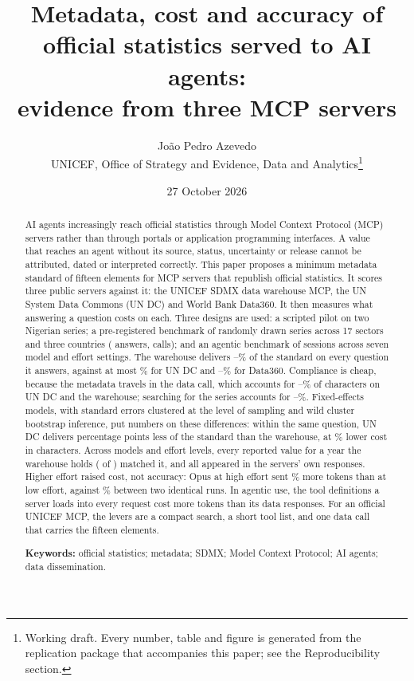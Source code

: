 \documentclass[11pt,a4paper]{article}
\title{Metadata, cost and accuracy of official statistics served to AI agents:\\ evidence from three MCP servers}
\author{Jo\~ao Pedro Azevedo\\ UNICEF, Office of Strategy and Evidence, Data and Analytics\thanks{Working draft. Every number, table and figure is generated from the replication package that accompanies this paper; see the Reproducibility section.}}
\date{27 October 2026}
\begin{document}
\maketitle

\begin{abstract}
\noindent AI agents increasingly reach official statistics through Model Context Protocol (MCP) servers rather than through portals or application programming interfaces. A value that reaches an agent without its source, status, uncertainty or release cannot be attributed, dated or interpreted correctly. This paper proposes a minimum metadata standard of fifteen elements for MCP servers that republish official statistics. It scores three public servers against it: the UNICEF SDMX data warehouse MCP, the UN System Data Commons (UN DC) and World Bank Data360. It then measures what answering a question costs on each. Three designs are used: a scripted pilot on two Nigerian series; a pre-registered benchmark of \nSeries{} randomly drawn series across 17 sectors and three countries (\nAnswers{} answers, \callsUsed{} calls); and an agentic benchmark of \sessions{} sessions across seven model and effort settings. The warehouse delivers \whShareMin--\whShareMax\% of the standard on every question it answers, against at most \unShareMax\% for UN DC and \dShareMin--\dShareMax\% for Data360. Compliance is cheap, because the metadata travels in the data call, which accounts for \dataUn--\dataWh\% of characters on UN DC and the warehouse; searching for the series accounts for \discWh--\discUn\%. Fixed-effects models, with standard errors clustered at the level of sampling and wild cluster bootstrap inference, put numbers on these differences: within the same question, UN DC delivers \efShareUn{} percentage points less of the standard than the warehouse, at \efCharsUn\% lower cost in characters. Across models and effort levels, every reported value for a year the warehouse holds ( of ) matched it, and all  appeared in the servers' own responses. Higher effort raised cost, not accuracy: Opus at high effort sent \efOpusSent\% more tokens than at low effort, against \efRepSent\% between two identical runs. In agentic use, the tool definitions a server loads into every request cost more tokens than its data responses. For an official UNICEF MCP, the levers are a compact search, a short tool list, and one data call that carries the fifteen elements.

\medskip\noindent\textbf{Keywords:} official statistics; metadata; SDMX; Model Context Protocol; AI agents; data dissemination.
\end{abstract}
\end{document}
